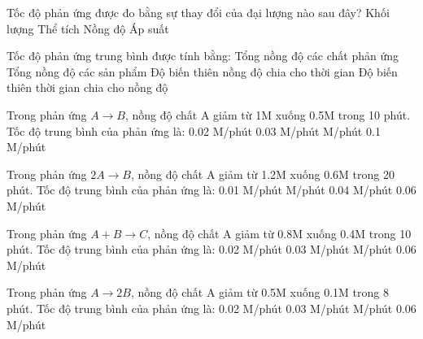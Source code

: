 \documentclass[Main.tex]{subfiles}
\begin{document}
    \begin{ex}
         Tốc độ phản ứng được đo bằng sự thay đổi của đại lượng nào sau đây?
        \choice
        {Khối lượng}
        {Thể tích}
        {\True Nồng độ}
        {Áp suất}
    \end{ex}
    \begin{ex}
        Tốc độ phản ứng trung bình được tính bằng:
        \choice
        {Tổng nồng độ các chất phản ứng}
        {Tổng nồng độ các sản phẩm}
        {\True Độ biến thiên nồng độ chia cho thời gian}
        {Độ biến thiên thời gian chia cho nồng độ}
    \end{ex}
     \begin{ex}
        Trong phản ứng $A \rightarrow B$, nồng độ chất A giảm từ 1M xuống 0.5M trong 10 phút. Tốc độ trung bình của phản ứng là:
        \choice
        {0.02 M/phút}
        {0.03 M/phút}
        { M/phút}
        {0.1 M/phút}
        \loigiai{
            \[
                v_{tb} = \frac{1 - 0.5}{10} = 0.05 \text{ M/phút}
            \]
        }
    \end{ex}
     \begin{ex}
        Trong phản ứng $2A \rightarrow B$, nồng độ chất A giảm từ 1.2M xuống 0.6M trong 20 phút. Tốc độ trung bình của phản ứng là:
        \choice
        {0.01 M/phút}
        { M/phút}
        {0.04 M/phút}
        {0.06 M/phút}
        \loigiai{
            \[
                v_{tb} = \frac{1.2 - 0.6}{20} = 0.03 \text{ M/phút}
            \]
        }
    \end{ex}
    \begin{ex}
        Trong phản ứng $A + B \rightarrow C$, nồng độ chất A giảm từ 0.8M xuống 0.4M trong 10 phút. Tốc độ trung bình của phản ứng là:
        \choice
        {0.02 M/phút}
        {0.03 M/phút}
        { M/phút}
        {0.06 M/phút}
        \loigiai{
            \[
                v_{tb} = \frac{0.8 - 0.4}{10} = 0.04 \text{ M/phút}
            \]
        }
    \end{ex}
    \begin{ex}
        Trong phản ứng $A \rightarrow 2B$, nồng độ chất A giảm từ 0.5M xuống 0.1M trong 8 phút. Tốc độ trung bình của phản ứng là:
         \choice
        {0.02 M/phút}
        {0.03 M/phút}
        { M/phút}
        {0.06 M/phút}
        \loigiai{
            \[
                v_{tb} = \frac{0.5 - 0.1}{8} = 0.05 \text{ M/phút}
            \]
        }
    \end{ex}
\end{document}
